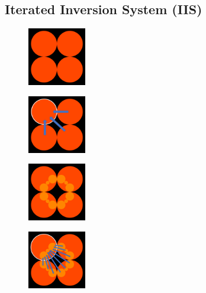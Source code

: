 \subsection{Iterated Inversion System (IIS)}

\begin{figure}[htbp]
 \begin{minipage}[t]{0.16\hsize}
  \center
  \includegraphics[width=1in, height=1in, keepaspectratio]{./img/preparation/orbit/level0c.pdf}
  \subcaption{}
  \label{fig:level0}
 \end{minipage}
 \begin{minipage}[t]{0.16\hsize}
  \center
  \includegraphics[width=1in, height=1in, keepaspectratio]{./img/preparation/orbit/level0invc.pdf}
  \subcaption{}
   \label{fig:level0inv}
 \end{minipage}
 \begin{minipage}[t]{0.16\hsize}
  \center
  \includegraphics[width=1in, height=1in, keepaspectratio]{./img/preparation/orbit/level1c.pdf}
  \subcaption{}
   \label{fig:level1}
 \end{minipage}
 \begin{minipage}[t]{0.16\hsize}
  \center
  \includegraphics[width=1in, height=1in,
  keepaspectratio]{./img/preparation/orbit/level1invc.pdf}
  \subcaption{}
  \label{fig:level1inv}
 \end{minipage}

\end{figure}
